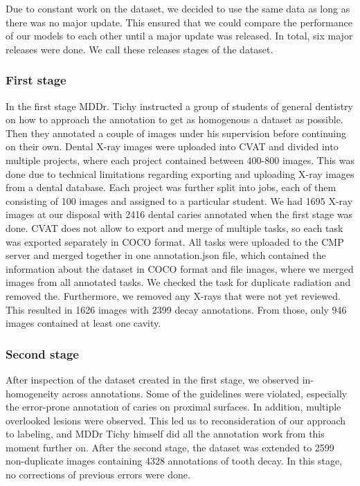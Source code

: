 Due to constant work on the dataset, we decided to use the same data as long as there was no major update. This ensured that we could compare the performance of our models to each other until a major update was released. In total, six major releases were done. We call these releases stages of the dataset.

\subsubsection{First stage}
In the first stage MDDr. Tichy instructed a group of students of general dentistry on how to approach the annotation to get as homogenous a dataset as possible. Then they annotated a couple of images under his supervision before continuing on their own.
Dental X-ray images were uploaded into CVAT and divided into multiple projects, where each project contained between 400-800 images. This was done due to technical limitations regarding exporting and uploading X-ray images from a dental database. Each project was further split into jobs, each of them consisting of 100 images and assigned to a particular student. We had 1695 X-ray images at our disposal with 2416 dental caries annotated when the first stage was done. CVAT does not allow to export and merge of multiple tasks, so each task was exported separately in COCO format. All tasks were uploaded to the CMP server and merged together in one annotation.json file, which contained the information about the dataset in COCO format and file images, where we merged images from all annotated tasks. We checked the task for duplicate radiation and removed the. Furthermore, we removed any X-rays that were not yet reviewed. This resulted in 1626 images with 2399 decay annotations. From those, only 946 images contained at least one cavity.


\subsubsection{Second stage}
After inspection of the dataset created in the first stage, we observed in-homogeneity across annotations. Some of the guidelines were violated, especially the error-prone annotation of caries on proximal surfaces. In addition, multiple overlooked lesions were observed. This led us to reconsideration of our approach to labeling, and MDDr Tichy himself did all the annotation work from this moment further on. After the second stage, the dataset was extended to 2599 non-duplicate images containing 4328 annotations of tooth decay. In this stage, no corrections of previous errors were done.


